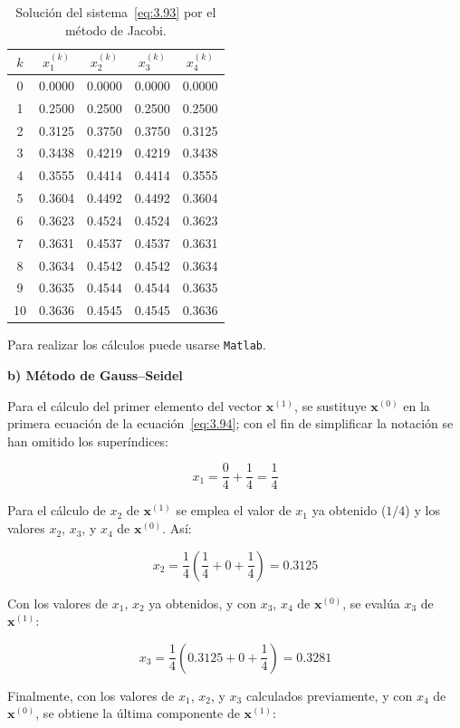 \documentclass[12pt,letterpaper]{article}
\theoremstyle{definition}
\theoremstyle{plain}
\theoremstyle{remark}
\begin{document}
\begin{table}[h!]
\centering
\caption{Solución del sistema~\eqref{eq:3.93} por el método de Jacobi.}
\begin{tabular}{c|c c c c}
$k$ & $x_1^{(k)}$ & $x_2^{(k)}$ & $x_3^{(k)}$ & $x_4^{(k)}$ \\
\hline
0 & 0.0000 & 0.0000 & 0.0000 & 0.0000 \\
1 & 0.2500 & 0.2500 & 0.2500 & 0.2500 \\
2 & 0.3125 & 0.3750 & 0.3750 & 0.3125 \\
3 & 0.3438 & 0.4219 & 0.4219 & 0.3438 \\
4 & 0.3555 & 0.4414 & 0.4414 & 0.3555 \\
5 & 0.3604 & 0.4492 & 0.4492 & 0.3604 \\
6 & 0.3623 & 0.4524 & 0.4524 & 0.3623 \\
7 & 0.3631 & 0.4537 & 0.4537 & 0.3631 \\
8 & 0.3634 & 0.4542 & 0.4542 & 0.3634 \\
9 & 0.3635 & 0.4544 & 0.4544 & 0.3635 \\
10 & 0.3636 & 0.4545 & 0.4545 & 0.3636
\end{tabular}
\end{table}

\noindent
Para realizar los cálculos puede usarse \texttt{Matlab}.



\textbf{b) Método de Gauss–Seidel}

Para el cálculo del primer elemento del vector $\mathbf{x}^{(1)}$, se sustituye $\mathbf{x}^{(0)}$ en la primera ecuación de la ecuación~\eqref{eq:3.94}; con el fin de simplificar la notación se han omitido los superíndices:

\[
x_1 = \frac{0}{4} + \frac{1}{4} = \frac{1}{4}
\]

Para el cálculo de $x_2$ de $\mathbf{x}^{(1)}$ se emplea el valor de $x_1$ ya obtenido ($1/4$) y los valores $x_2$, $x_3$, y $x_4$ de $\mathbf{x}^{(0)}$. Así:

\[
x_2 = \frac{1}{4} \left( \frac{1}{4} + 0 + \frac{1}{4} \right) = 0.3125
\]

Con los valores de $x_1$, $x_2$ ya obtenidos, y con $x_3$, $x_4$ de $\mathbf{x}^{(0)}$, se evalúa $x_3$ de $\mathbf{x}^{(1)}$:

\[
x_3 = \frac{1}{4} \left( 0.3125 + 0 + \frac{1}{4} \right) = 0.3281
\]

Finalmente, con los valores de $x_1$, $x_2$, y $x_3$ calculados previamente, y con $x_4$ de $\mathbf{x}^{(0)}$, se obtiene la última componente de $\mathbf{x}^{(1)}$:
\end{document}
